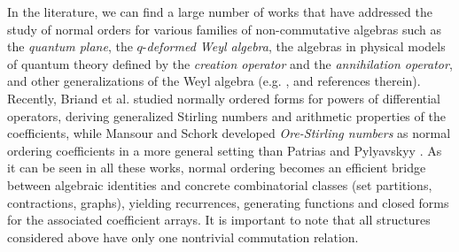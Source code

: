 \documentclass{amsart}
\theoremstyle{definition}
\theoremstyle{remark}
\numberwithin{equation}{section}
\begin{document}
In the literature, we can find a large number of works that have addressed the study of normal orders for various families of non-commutative algebras such as the {\em quantum plane}, the $q$-{\em deformed Weyl algebra}, the algebras in physical models of quantum theory defined by the {\em creation operator} and the {\em annihilation operator}, and other generalizations of the Weyl algebra (e.g. \cite{BlasiakPensonSolomon2003, BlasiakFlajolet2011, BlasiakHorzelaPensonSolomonDuchamp2007, HsuShiue1998, MansourSchork2015Book, Maslov1976, Nazaikinskiietal1995, Schork2021}, and references therein). Recently, Briand et al. \cite{BriandLopesRosas2020} studied normally ordered forms for powers of differential operators, deriving generalized Stirling numbers and arithmetic properties of the coefficients, while Mansour and Schork \cite{MansourSchork2023} developed \emph{Ore-Stirling numbers} as normal ordering coefficients in a more general setting than Patrias and Pylyavskyy \cite{PatriasPylyavskyy2018}. As it can be seen in all these works, normal ordering becomes an efficient bridge between algebraic identities and concrete combinatorial classes (set partitions, contractions, graphs), yielding recurrences, generating functions and closed forms for the associated coefficient arrays. It is important to note that all structures considered above have only one nontrivial commutation relation.





\end{document}
